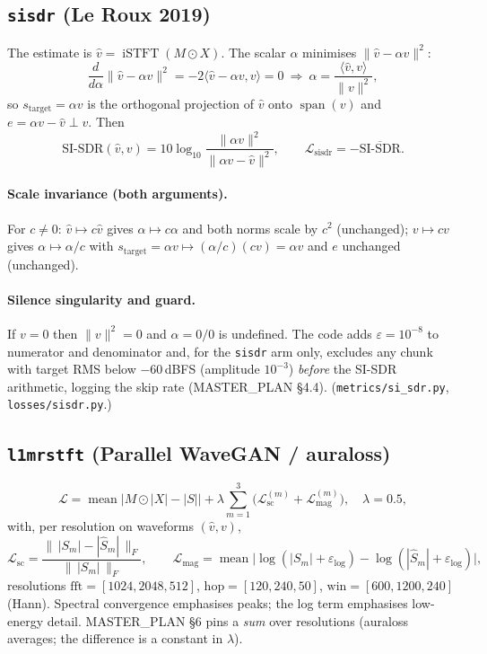 \documentclass[11pt]{article}
\newcommand{\code}[1]{\texttt{#1}}
\newcommand{\iSTFT}{\operatorname{iSTFT}}
\newcommand{\mean}{\operatorname{mean}}
\begin{document}
\subsection{\code{sisdr} (Le Roux 2019)}
The estimate is $\hat v=\iSTFT(M\odot X)$. The scalar $\alpha$ minimises
$\|\hat v-\alpha v\|^2$:
\[
\frac{d}{d\alpha}\|\hat v-\alpha v\|^2=-2\langle\hat v-\alpha v,v\rangle=0
\ \Longrightarrow\ \alpha=\frac{\langle\hat v,v\rangle}{\|v\|^2},
\]
so $s_{\mathrm{target}}=\alpha v$ is the orthogonal projection of $\hat v$ onto
$\operatorname{span}(v)$ and $e=\alpha v-\hat v\perp v$. Then
\[
\text{SI-SDR}(\hat v,v)=10\log_{10}\frac{\|\alpha v\|^2}{\|\alpha v-\hat v\|^2},
\qquad \mathcal L_{\mathrm{sisdr}}=-\overline{\text{SI-SDR}}.
\]

\paragraph{Scale invariance (both arguments).} For $c\neq0$: $\hat v\mapsto c\hat v$
gives $\alpha\mapsto c\alpha$ and both norms scale by $c^2$ (unchanged);
$v\mapsto cv$ gives $\alpha\mapsto\alpha/c$ with
$s_{\mathrm{target}}=\alpha v\mapsto(\alpha/c)(cv)=\alpha v$ and $e$ unchanged
(unchanged).

\paragraph{Silence singularity and guard.} If $v=0$ then $\|v\|^2=0$ and
$\alpha=0/0$ is undefined. The code adds $\varepsilon=10^{-8}$ to numerator and
denominator and, for the \code{sisdr} arm only, excludes any chunk with target
RMS below $-60$\,dBFS (amplitude $10^{-3}$) \emph{before} the SI-SDR arithmetic,
logging the skip rate (MASTER\_PLAN \S4.4). (\code{metrics/si\_sdr.py},
\code{losses/sisdr.py}.)

\subsection{\code{l1mrstft} (Parallel WaveGAN / auraloss)}
\[
\mathcal L=\mean\bigl|M\odot|X|-|S|\bigr|+\lambda\sum_{m=1}^{3}
\bigl(\mathcal L^{(m)}_{\mathrm{sc}}+\mathcal L^{(m)}_{\mathrm{mag}}\bigr),\quad\lambda=0.5,
\]
with, per resolution on waveforms $(\hat v,v)$,
\[
\mathcal L_{\mathrm{sc}}=\frac{\bigl\|\,|S_m|-|\hat S_m|\,\bigr\|_F}{\bigl\|\,|S_m|\,\bigr\|_F},
\qquad
\mathcal L_{\mathrm{mag}}=\mean\bigl|\log(|S_m|+\varepsilon_{\log})-\log(|\hat S_m|+\varepsilon_{\log})\bigr|,
\]
resolutions $\mathrm{fft}=[1024,2048,512]$, $\mathrm{hop}=[120,240,50]$,
$\mathrm{win}=[600,1200,240]$ (Hann). Spectral convergence emphasises peaks; the
log term emphasises low-energy detail. MASTER\_PLAN \S6 pins a \emph{sum} over
resolutions (auraloss averages; the difference is a constant in $\lambda$).
\end{document}
